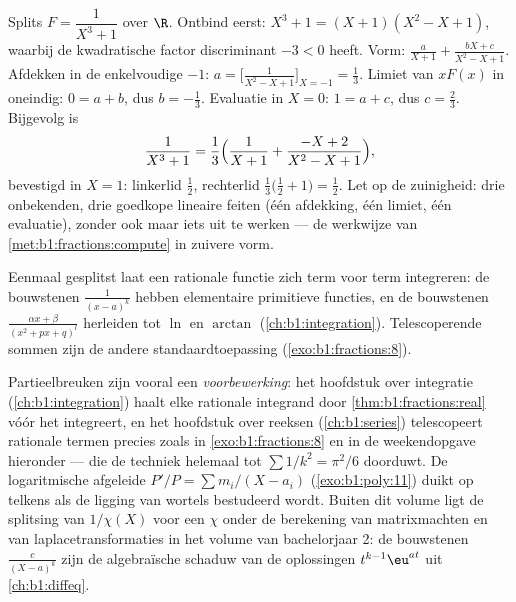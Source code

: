 \begin{example}\label{ex:b1:fractions:cubic}
Splits $F = \dfrac{1}{X^3 + 1}$ over $\R$. Ontbind eerst: $X^3 + 1 = (X +
1)(X^2 - X + 1)$, waarbij de kwadratische factor discriminant $-3 < 0$
heeft. Vorm: $\frac{a}{X+1} + \frac{bX + c}{X^2 - X + 1}$. Afdekken in de
enkelvoudige  $-1$: $a = \bigl[\frac1{X^2 - X + 1}\bigr]_{X=-1} =
\frac13$. Limiet van $xF(x)$ in oneindig: $0 = a + b$, dus $b =
-\frac13$. Evaluatie in $X = 0$: $1 = a + c$, dus $c = \frac23$.
Bijgevolg is
\[
\frac{1}{X^3+1} = \frac13\Bigl(\frac{1}{X+1}
+ \frac{-X + 2}{X^2 - X + 1}\Bigr) ,
\]
bevestigd in $X = 1$: linkerlid $\frac12$, rechterlid
$\frac13\bigl(\frac12 + 1\bigr) = \frac12$. Let op de zuinigheid: drie
onbekenden, drie goedkope lineaire feiten (één afdekking, één limiet, één
evaluatie), zonder ook maar iets uit te werken --- de werkwijze van
\cref{met:b1:fractions:compute} in zuivere vorm.
\end{example}

\begin{remark}
Eenmaal gesplitst laat een rationale functie zich term voor term
integreren: de bouwstenen $\frac{1}{(x-a)^k}$ hebben elementaire
primitieve functies, en de bouwstenen $\frac{\alpha x + \beta}{(x^2 + px
+ q)^l}$ herleiden tot $\ln$ en $\arctan$
(\cref{ch:b1:integration}). Telescoperende sommen zijn de andere
standaardtoepassing (\cref{exo:b1:fractions:8}).
\end{remark}

\begin{remark}\label{rem:b1:fractions:whereused}
Partieelbreuken zijn vooral een \emph{voorbewerking}: het hoofdstuk over
integratie (\cref{ch:b1:integration}) haalt elke rationale integrand door
\cref{thm:b1:fractions:real} vóór het integreert, en het hoofdstuk over
reeksen (\cref{ch:b1:series}) telescopeert rationale termen precies zoals
in \cref{exo:b1:fractions:8} en in de weekendopgave hieronder --- die de
techniek helemaal tot $\sum 1/k^2 = \pi^2/6$ doorduwt. De logaritmische
afgeleide $P'/P = \sum m_i/(X - a_i)$ (\cref{exo:b1:poly:11}) duikt op
telkens als de ligging van wortels bestudeerd wordt. Buiten dit volume
ligt de splitsing van $1/\chi(X)$ voor een 
$\chi$ onder de berekening van matrixmachten en van laplacetransformaties
in het volume van bachelorjaar 2: de bouwstenen $\frac{c}{(X - a)^k}$
zijn de algebraïsche schaduw van de oplossingen $t^{k-1}\eu^{at}$ uit
\cref{ch:b1:diffeq}.
\end{remark}

